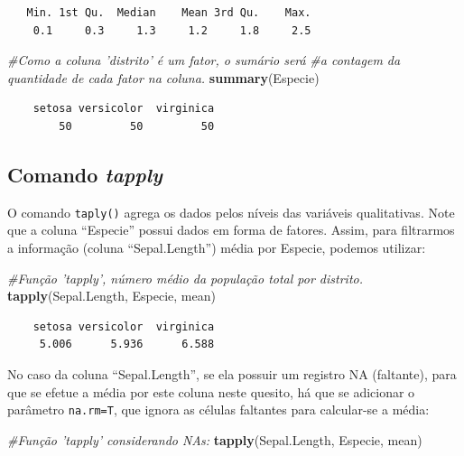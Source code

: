 \documentclass[12pt,brazil,oneside]{book}
\newenvironment{Shaded}{\begin{snugshade}}{\end{snugshade}}
\newcommand{\CommentTok}[1]{\textcolor[rgb]{0.56,0.35,0.01}{\textit{#1}}}
\newcommand{\KeywordTok}[1]{\textcolor[rgb]{0.13,0.29,0.53}{\textbf{#1}}}
\newcommand{\NormalTok}[1]{#1}
\begin{document}
\begin{verbatim}
   Min. 1st Qu.  Median    Mean 3rd Qu.    Max. 
    0.1     0.3     1.3     1.2     1.8     2.5 
\end{verbatim}

\begin{Shaded}
\begin{Highlighting}[]
\CommentTok{#Como a coluna 'distrito' é um fator, o sumário será }
\CommentTok{#a contagem da quantidade de cada fator na coluna.}
\KeywordTok{summary}\NormalTok{(Especie)}
\end{Highlighting}
\end{Shaded}

\begin{verbatim}
    setosa versicolor  virginica 
        50         50         50 
\end{verbatim}

\hypertarget{comando-tapply}{%
\subsection{\texorpdfstring{Comando
\emph{tapply}}{Comando tapply}}\label{comando-tapply}}

O comando \texttt{taply()} agrega os dados pelos níveis das variáveis
qualitativas. Note que a coluna ``Especie'' possui dados em forma de
fatores. Assim, para filtrarmos a informação (coluna ``Sepal.Length'')
média por Especie, podemos utilizar:

\begin{Shaded}
\begin{Highlighting}[]
\CommentTok{#Função 'tapply', número médio da população total por distrito.}
\KeywordTok{tapply}\NormalTok{(Sepal.Length, Especie, mean)}
\end{Highlighting}
\end{Shaded}

\begin{verbatim}
    setosa versicolor  virginica 
     5.006      5.936      6.588 
\end{verbatim}

No caso da coluna ``Sepal.Length'', se ela possuir um registro NA
(faltante), para que se efetue a média por este coluna neste quesito, há
que se adicionar o parâmetro \texttt{na.rm=T}, que ignora as células
faltantes para calcular-se a média:

\begin{Shaded}
\begin{Highlighting}[]
\CommentTok{#Função 'tapply' considerando NAs:}
\KeywordTok{tapply}\NormalTok{(Sepal.Length, Especie, mean)}
\end{Highlighting}
\end{Shaded}
\end{document}
